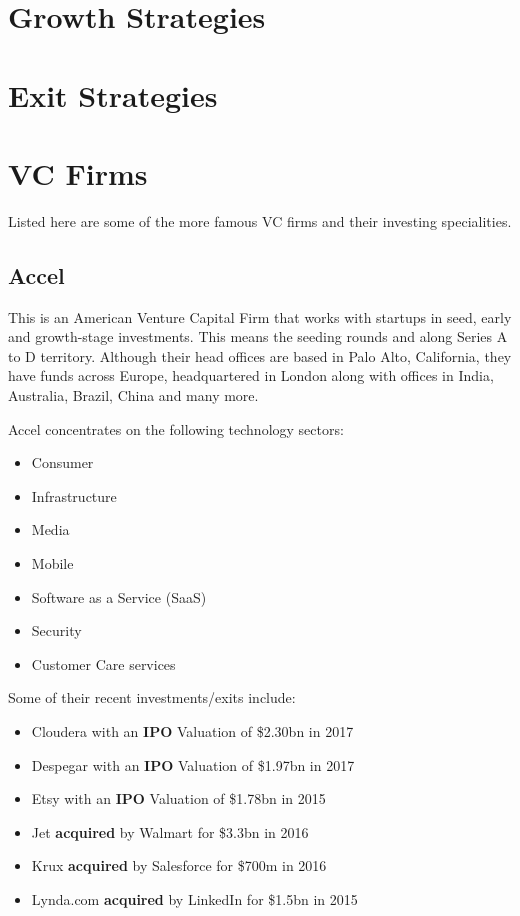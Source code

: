 \documentclass[a4paper]{article}
\begin{document}
{\newpage
\section{Growth Strategies}
\Blindtext

\newpage
\section{Exit Strategies}
\Blindtext

\newpage
\appendix
\section{VC Firms}
Listed here are some of the more famous VC firms and their investing specialities.

\subsection{Accel}
This is an American Venture Capital Firm that works with startups in seed, early and growth-stage investments. This means the seeding rounds and along Series A to D territory. Although their head offices are based in Palo Alto, California, they have funds across Europe, headquartered in London along with offices in India, Australia, Brazil, China and many more.

\vspace{5pt}
\noindent Accel concentrates on the following technology sectors:
\begin{itemize}
	\item Consumer
	\item Infrastructure
	\item Media
	\item Mobile
	\item Software as a Service (SaaS)
	\item Security
	\item Customer Care services
\end{itemize}
\vspace{5pt}
\noindent Some of their recent investments/exits include:
\begin{itemize}
	\item Cloudera with an \textbf{IPO} Valuation of \$2.30bn in 2017
	\item Despegar with an \textbf{IPO} Valuation of \$1.97bn in 2017
	\item Etsy with an \textbf{IPO} Valuation of \$1.78bn in 2015
	\item Jet \textbf{acquired} by Walmart for \$3.3bn in 2016
	\item Krux \textbf{acquired} by Salesforce for \$700m in 2016
	\item Lynda.com \textbf{acquired} by LinkedIn for \$1.5bn in 2015
\end{itemize}

}
\end{document}
